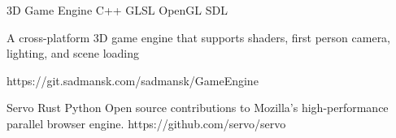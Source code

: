 



\begin{cvprojects}

\cvproject
{3D Game Engine}
{C++ \textbullet{} GLSL \textbullet{} OpenGL \textbullet{} SDL}
{
A cross-platform 3D game engine that supports shaders, first person camera, lighting, and scene loading
    \begin{cvitems}\end{cvitems} %
}
{https://git.sadmansk.com/sadmansk/GameEngine}


\cvproject
{Servo}
{Rust \textbullet{} Python}
{
Open source contributions to Mozilla's high-performance parallel browser engine.
}
{https://github.com/servo/servo}


\end{cvprojects}
